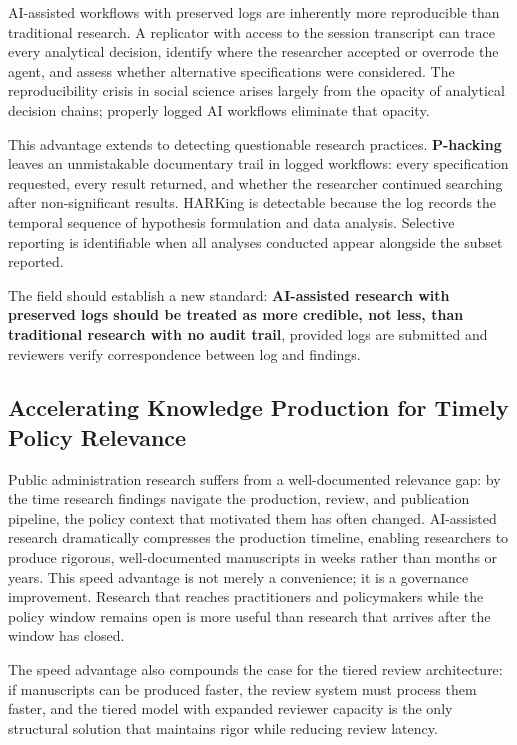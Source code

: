 \documentclass[12pt]{article}
\begin{document}
AI-assisted workflows with preserved logs are inherently more reproducible than traditional
research. A replicator with access to the session transcript can trace every analytical
decision, identify where the researcher accepted or overrode the agent, and assess whether
alternative specifications were considered. The reproducibility crisis in social science
\citep{elephantinthelab2025reproducibility} arises largely from the opacity of analytical
decision chains; properly logged AI workflows eliminate that opacity.

This advantage extends to detecting questionable research practices. \textbf{P-hacking}
leaves an unmistakable documentary trail in logged workflows: every specification requested,
every result returned, and whether the researcher continued searching after non-significant
results. HARKing is detectable because the log records the temporal sequence of hypothesis
formulation and data analysis. Selective reporting is identifiable when all analyses conducted
appear alongside the subset reported.

The field should establish a new standard: \textbf{AI-assisted research with preserved logs
should be treated as more credible, not less, than traditional research with no audit trail},
provided logs are submitted and reviewers verify correspondence between log and findings.

\subsection{Accelerating Knowledge Production for Timely Policy Relevance}

Public administration research suffers from a well-documented relevance gap: by the time
research findings navigate the production, review, and publication pipeline, the policy
context that motivated them has often changed. AI-assisted research dramatically compresses
the production timeline, enabling researchers to produce rigorous, well-documented manuscripts
in weeks rather than months or years. This speed advantage is not merely a convenience; it
is a governance improvement. Research that reaches practitioners and policymakers while the
policy window remains open is more useful than research that arrives after the window has
closed.

The speed advantage also compounds the case for the tiered review architecture: if
manuscripts can be produced faster, the review system must process them faster, and
the tiered model with expanded reviewer capacity is the only structural solution
that maintains rigor while reducing review latency.
\end{document}

